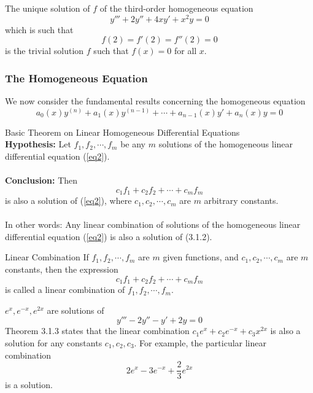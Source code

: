 \begin{example}{}{}
    The unique solution of $f$ of the third-order homogeneous equation \[
        y''' + 2y'' + 4xy' + x^2y = 0
    \] which is such that \[
        f(2) = f'(2) = f''(2) = 0
    \] is the trivial solution $f$ such that $f(x)=0$ for all $x$.
\end{example}

\vspace{20pt}
\subsubsection{The Homogeneous Equation}

We now consider the fundamental results concerning the homogeneous equation
\begin{equation}\tag{3.1.2}
    a_0(x)y^{(n)} + a_1(x)y^{(n-1)} + \cdots + a_{n-1}(x)y' + a_n(x)y = 0
\end{equation}

\begin{theorem}{Basic Theorem on Linear Homogeneous Differential Equations}{}
    \\\textbf{Hypothesis:} Let $f_1, f_2, \cdots, f_m$ be any $m$ solutions of the homogeneous linear differential equation (\ref{eq2}).\\~\\
    \textbf{Conclusion:} Then \[
        c_1f_1 + c_2f_2 + \cdots + c_mf_m
    \] is also a solution of (\ref{eq2}), where $c_1, c_2, \cdots, c_m$ are $m$ arbitrary constants.\\~\\

    In other words: Any linear combination of solutions of the homogeneous linear differential equation (\ref{eq2}) is also a solution of (3.1.2).
\end{theorem}

\begin{definition}{Linear Combination}{}
    If $f_1, f_2, \cdots, f_m$ are $m$ given functions, and $c_1, c_2, \cdots, c_m$ are $m$ constants, then the expression \[
        c_1f_1 + c_2f_2 + \cdots + c_mf_m
    \] is called a linear combination of $f_1, f_2, \cdots, f_m$.
\end{definition}

\begin{example}{}{}
    $e^x, e^{-x}, e^{2x}$ are solutions of \[
        y''' - 2y'' - y' + 2y = 0
    \] Theorem 3.1.3 states that the linear combination $c_1e^x + c_2e^{-x} + c_3x^{2x}$ is also a solution for any constants $c_1, c_2, c_3$. For example, the particular linear combination \[
        2e^x - 3e^{-x} + \frac{2}{3}e^{2x}
    \] is a solution.
\end{example}

